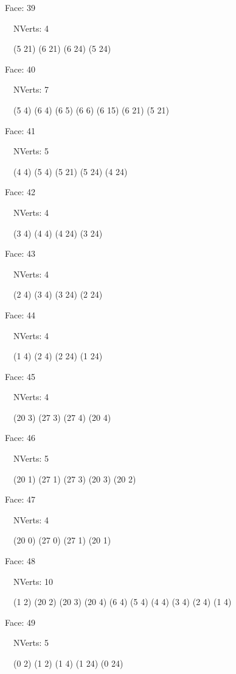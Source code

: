 \documentclass{article}
\begin{document}
{\footnotesize 

Face: 39

\   \    NVerts: 4

 \   \   (5 21) (6 21) (6 24) (5 24)}

{\footnotesize 

Face: 40

\   \    NVerts: 7

 \   \   (5 4) (6 4) (6 5) (6 6) (6 15) (6 21) (5 21)}

{\footnotesize 

Face: 41

\   \    NVerts: 5

 \   \   (4 4) (5 4) (5 21) (5 24) (4 24)}

{\footnotesize 

Face: 42

\   \    NVerts: 4

 \   \   (3 4) (4 4) (4 24) (3 24)}

{\footnotesize 

Face: 43

\   \    NVerts: 4

 \   \   (2 4) (3 4) (3 24) (2 24)}

{\footnotesize 

Face: 44

\   \    NVerts: 4

 \   \   (1 4) (2 4) (2 24) (1 24)}

{\footnotesize 

Face: 45

\   \    NVerts: 4

 \   \   (20 3) (27 3) (27 4) (20 4)}

{\footnotesize 

Face: 46

\   \    NVerts: 5

 \   \   (20 1) (27 1) (27 3) (20 3) (20 2)}

{\footnotesize 

Face: 47

\   \    NVerts: 4

 \   \   (20 0) (27 0) (27 1) (20 1)}

{\footnotesize 

Face: 48

\   \    NVerts: 10

 \   \   (1 2) (20 2) (20 3) (20 4) (6 4) (5 4) (4 4) (3 4) (2 4) (1 4)}

{\footnotesize 

Face: 49

\   \    NVerts: 5

 \   \   (0 2) (1 2) (1 4) (1 24) (0 24)}
\end{document}
